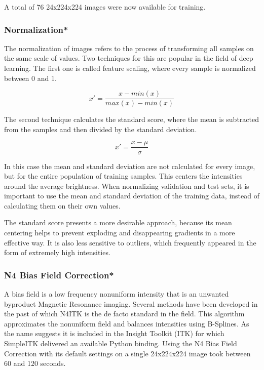 A total of 76 24x224x224 images were now available for training.

\subsubsection{Normalization*}

The normalization of images refers to the process of transforming all samples on the same scale of values. Two techniques for this are popular in the field of deep learning. The first one is called feature scaling, where every sample is normalized between 0 and 1.

\begin{equation}
x' = \frac {x - min(x)}{max(x) - min(x)}
\end{equation}

The second technique calculates the standard score, where the mean is subtracted from the samples and then divided by the standard deviation.

\begin{equation}
x' = \frac {x - \mu}{\sigma}
\end{equation}

In this case the mean and standard deviation are not calculated for every image, but for the entire population of training samples. This centers the intensities around the average brightness. When normalizing validation and test sets, it is important to use the mean and standard deviation of the training data, instead of calculating them on their own values.

The standard score presents a more desirable approach, because its mean centering helps to prevent exploding and disappearing gradients in a more effective way. It is also less sensitive to outliers, which frequently appeared in the form of extremely high intensities. 

\subsubsection{N4 Bias Field Correction*}

A bias field is a low frequency nonuniform intensity that is an unwanted byproduct Magnetic Resonance imaging. Several methods have been developed in the past of which N4ITK \cite{Tustison2010} is the de facto standard in the field. This algorithm approximates the nonuniform field and balances intensities using B-Splines. As the name suggests it is included in the Insight Toolkit (ITK) for which SimpleITK delivered an available Python binding. Using the N4 Bias Field Correction with its default settings on a single 24x224x224 image took between 60 and 120 seconds.

